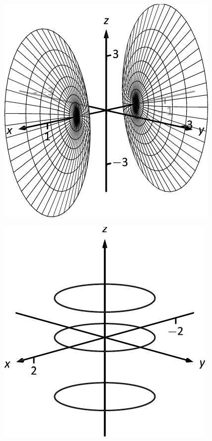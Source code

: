 \documentclass[10pt]{article}
\begin{document}
\includegraphics{figspace6_3DBW.pdf}
\texttt{}

\includegraphics{figspacecylinder1_3DBW.pdf}
\texttt{}
\end{document}
